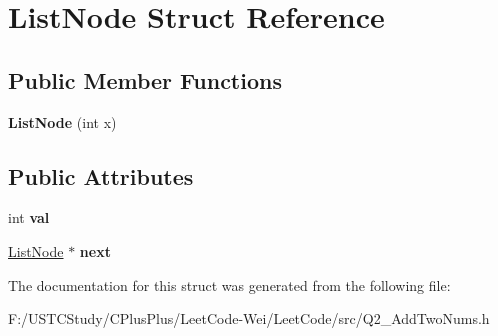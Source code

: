 \hypertarget{struct_list_node}{}\section{List\+Node Struct Reference}
\label{struct_list_node}
\subsection*{Public Member Functions}
\begin{DoxyCompactItemize}
\item 
\hypertarget{struct_list_node_aaad9b553e2f936726f5b35ff2734125d}{}\label{struct_list_node_aaad9b553e2f936726f5b35ff2734125d} 
{\bfseries List\+Node} (int x)
\end{DoxyCompactItemize}
\subsection*{Public Attributes}
\begin{DoxyCompactItemize}
\item 
\hypertarget{struct_list_node_a58389d1d1fc5430c2f4ce7c5d5dc48b3}{}\label{struct_list_node_a58389d1d1fc5430c2f4ce7c5d5dc48b3} 
int {\bfseries val}
\item 
\hypertarget{struct_list_node_ad78b392c2ddc25c3243d0c2f30692fb1}{}\label{struct_list_node_ad78b392c2ddc25c3243d0c2f30692fb1} 
\hyperlink{struct_list_node}{List\+Node} $\ast$ {\bfseries next}
\end{DoxyCompactItemize}


The documentation for this struct was generated from the following file\+:\begin{DoxyCompactItemize}
\item 
F\+:/\+U\+S\+T\+C\+Study/\+C\+Plus\+Plus/\+Leet\+Code-\/\+Wei/\+Leet\+Code/src/Q2\+\_\+\+Add\+Two\+Nums.\+h\end{DoxyCompactItemize}
